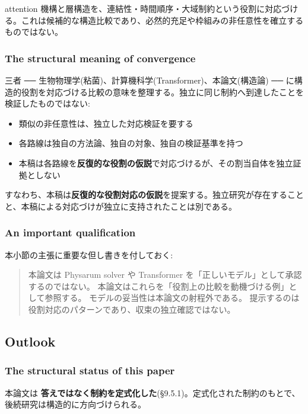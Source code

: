 attention 機構と層構造を、連結性・時間順序・大域制約という役割に対応づける。これは候補的な構造比較であり、必然的充足や枠組みの非任意性を確立するものではない。

\subsubsection{The structural meaning of convergence}


三者 ── 生物物理学(粘菌)、計算機科学(Transformer)、本論文(構造論) ── に構造的役割を対応づける比較の意味を整理する。独立に同じ制約へ到達したことを検証したものではない:

\begin{itemize}
\item 類似の非任意性は、独立した対応検証を要する
\item 各路線は独自の方法論、独自の対象、独自の検証基準を持つ
\item 本稿は各路線を\textbf{反復的な役割の仮説}で対応づけるが、その割当自体を独立証拠としない
\end{itemize}

すなわち、本稿は\textbf{反復的な役割対応の仮説}を提案する。独立研究が存在することと、本稿による対応づけが独立に支持されたことは別である。

\subsubsection{An important qualification}


本小節の主張に重要な但し書きを付しておく:

\begin{quote}
本論文は Physarum solver や Transformer を「正しいモデル」として承認するのではない。
本論文はこれらを「役割上の比較を動機づける例」として参照する。
モデルの妥当性は本論文の射程外である。
提示するのは役割対応のパターンであり、収束の独立確認ではない。
\end{quote}

\subsection{Outlook}


\subsubsection{The structural status of this paper}


本論文は \textbf{答えではなく制約を定式化した}(\S{}9.5.1)。定式化された制約のもとで、後続研究は構造的に方向づけられる。

